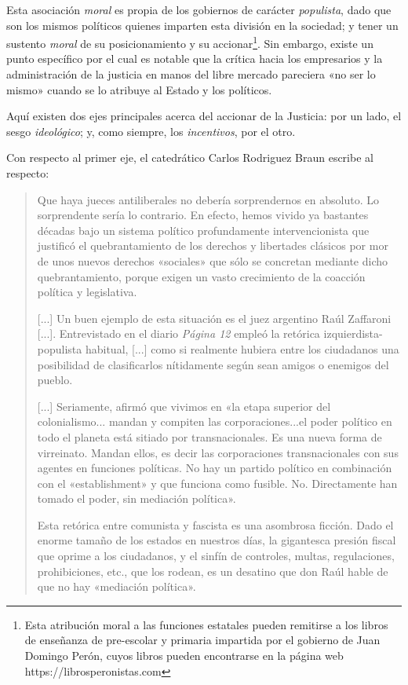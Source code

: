 \documentclass[12pt,a4paper,twoside]{book}
\begin{document}
Esta asociación \textit{moral} es propia de los gobiernos de carácter \textit{populista}, dado que son los mismos políticos quienes imparten esta división en la sociedad; y tener un sustento \textit{moral} de su posicionamiento y su accionar\footnote{Esta atribución moral a las funciones estatales pueden remitirse a los libros de enseñanza de pre-escolar y primaria impartida por el gobierno de Juan Domingo Perón, cuyos libros pueden encontrarse en la página web https://librosperonistas.com}. Sin embargo, existe un punto específico por el cual es notable que la crítica hacia los empresarios y la administración de la justicia en manos del libre mercado pareciera «no ser lo mismo» cuando se lo atribuye al Estado y los políticos.

Aquí existen dos ejes principales acerca del accionar de la Justicia: por un lado, el sesgo \textit{ideológico}; y, como siempre, los \textit{incentivos}, por el otro.

Con respecto al primer eje, el catedrático Carlos Rodriguez Braun escribe al respecto:

\begin{quotation}
Que haya jueces antiliberales no debería sorprendernos en absoluto. Lo sorprendente sería lo contrario. En efecto, hemos vivido ya bastantes décadas bajo un sistema político profundamente intervencionista que justificó el quebrantamiento de los derechos y libertades clásicos por mor de unos nuevos derechos «sociales» que sólo se concretan mediante dicho quebrantamiento, porque exigen un vasto crecimiento de la coacción política y legislativa. 

[...] Un buen ejemplo de esta situación es el juez argentino Raúl Zaffaroni [...]. Entrevistado en el diario \textit{Página 12} empleó la retórica izquierdista-populista habitual, [...] como si realmente hubiera entre los ciudadanos una posibilidad de clasificarlos nítidamente según sean amigos o enemigos del pueblo. 

[...] Seriamente, afirmó que vivimos en «la etapa superior del colonialismo... mandan y compiten las corporaciones...el poder político en todo el planeta está sitiado por transnacionales. Es una nueva forma de virreinato. Mandan ellos, es decir las corporaciones transnacionales con sus agentes en funciones políticas. No hay un partido político en combinación con el «establishment» y que funciona como fusible. No. Directamente han tomado el poder, sin mediación política».

Esta retórica entre comunista y fascista es una asombrosa ficción. Dado el enorme tamaño de los estados en nuestros días, la gigantesca presión fiscal que oprime a los ciudadanos, y el sinfín de controles, multas, regulaciones, prohibiciones, etc., que los rodean, es un desatino que don Raúl hable de que no hay «mediación política». \cite{crb:just-popul}
\end{quotation}
\end{document}
